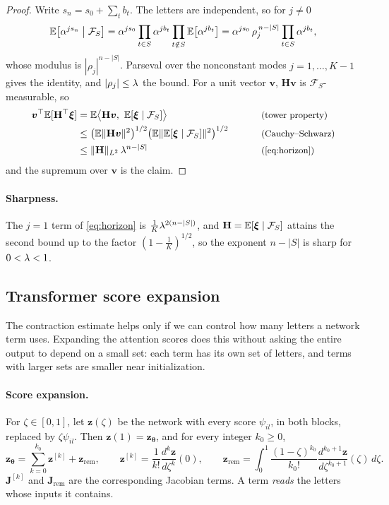 \begin{proof}
Write $s_n=s_0+\sum_tb_t$. The letters are independent, so for $j\ne0$
\[
 \mathbb E\bigl[\alpha^{js_n}\bigm|\mathcal F_S\bigr]=\alpha^{js_0}\prod_{t\in S}\alpha^{jb_t}\prod_{t\notin S}\mathbb E\bigl[\alpha^{jb_t}\bigr]=\alpha^{js_0}\,\rho_j^{\,n-|S|}\prod_{t\in S}\alpha^{jb_t},
\]
whose modulus is $|\rho_j|^{n-|S|}$. Parseval over the nonconstant modes $j=1,\ldots,K-1$ gives the identity, and $|\rho_j|\le\lambda$ the bound.
For a unit vector $\bm v$, $\mathbf H\bm v$ is $\mathcal F_S$-measurable, so
\begin{alignat*}{2}
 \bm v^\top\E[\mathbf H^\top\bm\xi]&=\E\bigl\langle\mathbf H\bm v,\ \E[\bm\xi\mid\mathcal F_S]\bigr\rangle &\qquad& \why{tower property}\\
 &\le\bigl(\E\|\mathbf H\bm v\|^2\bigr)^{1/2}\bigl(\E\|\E[\bm\xi\mid\mathcal F_S]\|^2\bigr)^{1/2} && \why{Cauchy--Schwarz}\\
 &\le\|\mathbf H\|_{L^2}\,\mixrate^{n-|S|} && \why{\cref{eq:horizon}}
\end{alignat*}
and the supremum over $\bm v$ is the claim.
\end{proof}

\paragraph{Sharpness.}\label{rem:tight} The $j=1$ term of \cref{eq:horizon} is $\frac{1}{K}\lambda^{2(n-|S|)}$, and $\mathbf H=\mathbb E[\bm\xi\mid\mathcal F_S]$ attains the second bound up to the
factor $(1-\frac{1}{K})^{1/2}$, so the exponent $n-|S|$ is sharp for $0<\lambda<1$.

\subsection{Transformer score expansion}
\label{app:model-spectrum}

The contraction estimate helps only if we can control how many letters a network term uses. Expanding the attention scores does
this without asking the entire output to depend on a small set: each term has its own set of letters, and terms with larger sets
are smaller near initialization.

\paragraph{Score expansion.} For $\zeta\in[0,1]$, let $\bm z(\zeta)$ be the network with every score $\psi_{il}$, in both blocks, replaced by
$\zeta\psi_{il}$. Then $\bm z(1)=\bm z_{\bm\theta}$, and for every integer $k_0\ge0$,
\begin{equation}
 \bm z_{\bm\theta}=\sum_{k=0}^{k_0}\bm z^{[k]}+\bm z_{\mathrm{rem}},\qquad
 \bm z^{[k]}=\frac{1}{k!}\frac{d^k\bm z}{d\zeta^k}(0),\qquad
 \bm z_{\mathrm{rem}}=\int_0^1\frac{(1-\zeta)^{k_0}}{k_0!}\frac{d^{k_0+1}\bm z}{d\zeta^{k_0+1}}(\zeta)\,d\zeta .
 \label{eq:score-split}
\end{equation}
$\mathbf J^{[k]}$ and $\mathbf J_{\mathrm{rem}}$ are the corresponding Jacobian terms. A term \emph{reads} the letters whose inputs it contains.

